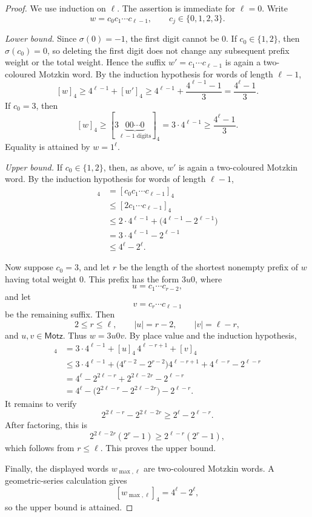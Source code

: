 \documentclass[12pt]{article}
\theoremstyle{plain}
\theoremstyle{definition}
\theoremstyle{plain}
\begin{document}
\begin{proof}
We use induction on $\ell$.  The assertion is immediate for $\ell=0$.
Write
\[
 w=c_0c_1\cdots c_{\ell-1},
 \qquad
 c_j\in\{0,1,2,3\}.
\]

\emph{Lower bound.}
Since $\sigma(0)=-1$, the first digit cannot be $0$.  If $c_0\in\{1,2\}$, then $\sigma(c_0)=0$, so deleting the first
digit does not change any subsequent prefix weight or the total weight.
Hence the suffix $w'=c_1\cdots c_{\ell-1}$ is again a two-coloured
Motzkin word.  By the induction hypothesis for words of length $\ell-1$,
\[
  [w]_4\geq4^{\ell-1}+[w']_4
  \geq4^{\ell-1}+\frac{4^{\ell-1}-1}{3}
  =\frac{4^{\ell}-1}{3}.
\]
If $c_0=3$, then
\[
  [w]_4
  \geq[3\underbrace{00\cdots0}_{\ell-1\text{ digits}}]_4
  =3\cdot4^{\ell-1}
  \geq\frac{4^{\ell}-1}{3}.
\]
Equality is attained by $w=1^{\ell}$.

\emph{Upper bound.}
If $c_0\in\{1,2\}$, then, as above, $w'$ is again a two-coloured
Motzkin word.  By the induction hypothesis for words of length $\ell-1$,
\begin{align*}
  [w]_4
  &=[c_0c_1\cdots c_{\ell-1}]_4\\
  &\leq[2c_1\cdots c_{\ell-1}]_4\\
  &\leq2\cdot4^{\ell-1}+\bigl(4^{\ell-1}-2^{\ell-1}\bigr)\\
  &=3\cdot4^{\ell-1}-2^{\ell-1}\\
  &\leq4^{\ell}-2^{\ell}.
\end{align*}

Now suppose $c_0=3$, and let $r$ be the length of the shortest nonempty
prefix of $w$ having total weight $0$.  This prefix has the form $3u0$,
where
\[
 u=c_1\cdots c_{r-2},
\]
and let
\[
 v=c_r\cdots c_{\ell-1}
\]
be the remaining suffix.  Then
\[
 2\leq r\leq\ell,
 \qquad
 |u|=r-2,
 \qquad
 |v|=\ell-r,
\]
and $u,v\in\mathsf{Motz}$.  Thus $w=3u0v$.  By place value and the induction hypothesis,
\begin{align*}
  [w]_4
  &=3\cdot4^{\ell-1}+[u]_4\,4^{\ell-r+1}+[v]_4\\
  &\leq3\cdot4^{\ell-1}
    +\bigl(4^{r-2}-2^{r-2}\bigr)4^{\ell-r+1}
    +4^{\ell-r}-2^{\ell-r}\\
  &=4^{\ell}-2^{2\ell-r}+2^{2\ell-2r}-2^{\ell-r}\\
  &=4^{\ell}-\bigl(2^{2\ell-r}-2^{2\ell-2r}\bigr)-2^{\ell-r}.
\end{align*}
It remains to verify
\[
  2^{2\ell-r}-2^{2\ell-2r}
  \geq2^{\ell}-2^{\ell-r}.
\]
After factoring, this is
\[
  2^{2\ell-2r}(2^r-1)\geq2^{\ell-r}(2^r-1),
\]
which follows from $r\leq\ell$.  This proves the upper bound.

Finally, the displayed words $w_{\max,\ell}$ are two-coloured Motzkin words.
A geometric-series calculation gives
\[
  [w_{\max,\ell}]_4=4^{\ell}-2^{\ell},
\]
so the upper bound is attained.
\end{proof}
\end{document}
